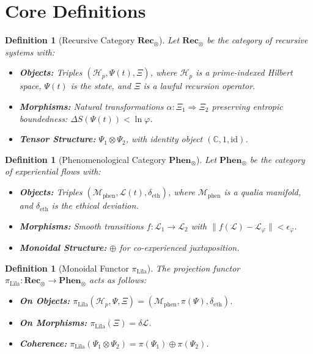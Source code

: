 \documentclass[12]{amsart}
\theoremstyle{plain}
\newtheorem{definition}[theorem]{Definition}
\begin{document}
\section{Core Definitions}

\begin{definition}[Recursive Category $\mathbf{Rec}_\otimes$]
Let $\mathbf{Rec}_\otimes$ be the category of recursive systems with:
\begin{itemize}
    \item \textbf{Objects:} Triples $(\mathcal{H}_p, \Psi(t), \Xi)$, where $\mathcal{H}_p$ is a prime-indexed Hilbert space, $\Psi(t)$ is the state, and $\Xi$ is a lawful recursion operator.
    \item \textbf{Morphisms:} Natural transformations $\alpha: \Xi_1 \Rightarrow \Xi_2$ preserving entropic boundedness: $\Delta S(\Psi(t)) < \ln \varphi$.
    \item \textbf{Tensor Structure:} $\Psi_1 \otimes \Psi_2$, with identity object $(\mathbb{C}, 1, \text{id})$.
\end{itemize}
\end{definition}

\begin{definition}[Phenomenological Category $\mathbf{Phen}_\otimes$]
Let $\mathbf{Phen}_\otimes$ be the category of experiential flows with:
\begin{itemize}
    \item \textbf{Objects:} Triples $(\mathcal{M}_{\text{phen}}, \mathcal{L}(t), \delta_{\text{eth}})$, where $\mathcal{M}_{\text{phen}}$ is a qualia manifold, and $\delta_{\text{eth}}$ is the ethical deviation.
    \item \textbf{Morphisms:} Smooth transitions $f: \mathcal{L}_1 \rightarrow \mathcal{L}_2$ with $\|f(\mathcal{L}) - \mathcal{L}_\varphi\| < \epsilon_\varphi$.
    \item \textbf{Monoidal Structure:} $\oplus$ for co-experienced juxtaposition.
\end{itemize}
\end{definition}

\begin{definition}[Monoidal Functor $\pi_{\text{Līla}}$]
The projection functor $\pi_{\text{Līla}}: \mathbf{Rec}_\otimes \to \mathbf{Phen}_\otimes$ acts as follows:
\begin{itemize}
    \item \textbf{On Objects:} $\pi_{\text{Līla}}(\mathcal{H}_p, \Psi, \Xi) = (\mathcal{M}_{\text{phen}}, \pi(\Psi), \delta_{\text{eth}})$.
    \item \textbf{On Morphisms:} $\pi_{\text{Līla}}(\Xi) = \delta \mathcal{L}$.
    \item \textbf{Coherence:} $\pi_{\text{Līla}}(\Psi_1 \otimes \Psi_2) = \pi(\Psi_1) \oplus \pi(\Psi_2)$.
\end{itemize}
\end{definition}
\end{document}
